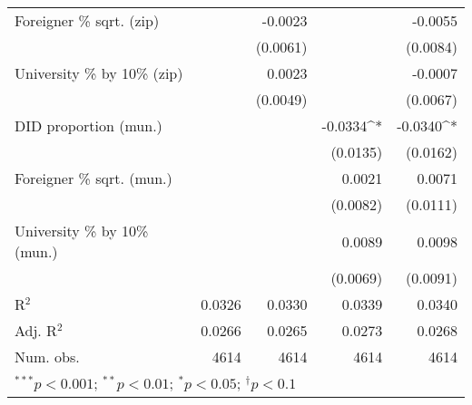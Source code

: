 \begin{tabular}{l D{.}{.}{4.5} D{.}{.}{4.5} D{.}{.}{4.5} D{.}{.}{4.5}}
Foreigner \% sqrt. (zip)          &             & -0.0023     &             & -0.0055     \\
                                  &             & (0.0061)    &             & (0.0084)    \\
University \% by 10\% (zip)       &             & 0.0023      &             & -0.0007     \\
                                  &             & (0.0049)    &             & (0.0067)    \\
DID proportion (mun.)             &             &             & -0.0334^{*} & -0.0340^{*} \\
                                  &             &             & (0.0135)    & (0.0162)    \\
Foreigner \% sqrt. (mun.)         &             &             & 0.0021      & 0.0071      \\
                                  &             &             & (0.0082)    & (0.0111)    \\
University \% by 10\% (mun.)      &             &             & 0.0089      & 0.0098      \\
                                  &             &             & (0.0069)    & (0.0091)    \\
\midrule
R$^2$                             & 0.0326      & 0.0330      & 0.0339      & 0.0340      \\
Adj. R$^2$                        & 0.0266      & 0.0265      & 0.0273      & 0.0268      \\
Num. obs.                         & 4614        & 4614        & 4614        & 4614        \\
\bottomrule
{}
\end{tabular}
